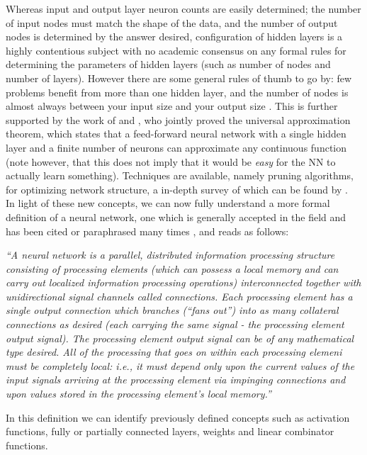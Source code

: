 \documentclass[12pt]{article}
\begin{document}
Whereas input and output layer neuron counts are easily determined; the number of input nodes must match the shape of the data, and the number of output nodes is determined by the answer desired, configuration of hidden layers is a highly contentious subject with no academic consensus on any formal rules for determining the parameters of hidden layers (such as number of nodes and number of layers). However there are some general rules of thumb to go by: few problems benefit from more than one hidden layer, and the number of nodes is almost always between your input size and your output size \autocite{Q+A_SAS}. This is further supported by the work of \textcite{cybenko1989approximations} and \textcite{hornik1991approximation}, who jointly proved the universal approximation theorem, which states that a feed-forward neural network with a single hidden layer and a finite number of neurons can approximate any continuous function (note however, that this does not imply that it would be \textit{easy} for the NN to actually learn something). Techniques are available, namely pruning algorithms, for optimizing network structure, a in-depth survey of which can be found by \textcite{248452}. 
\\\newline In light of these new concepts, we can now fully understand a more formal definition of a neural network, one which is generally accepted in the field and has been cited or paraphrased many times \autocite{simpson1991artificial,118638,zurada1992introduction}, and reads as follows:\\
\begin{addmargin}[2em]{0em}%
    \textit{``A neural network is a parallel, distributed information processing structure consisting of processing elements (which can possess a local
    memory and can carry out localized information processing operations) interconnected together with unidirectional signal channels called connections.
    Each processing element has a single output connection which branches (``fans out'') into as many collateral connections as desired (each carrying
    the same signal - the processing element output signal). The processing element output signal can be of any mathematical type desired. All of the
    processing that goes on within each processing elemeni must be completely local: i.e., it must depend only upon the current values of the input signals
    arriving at the processing element via impinging connections and upon values stored in the processing element's local memory.''}\\
\end{addmargin}
In this definition we can identify previously defined concepts such as activation functions, fully or partially connected layers, weights and linear combinator functions. 
\end{document}
